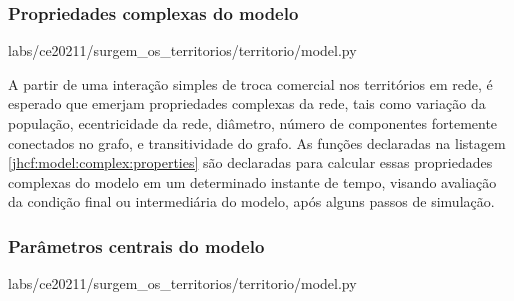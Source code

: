 \subsubsection{Propriedades complexas do modelo}


{labs/ce20211/surgem_os_territorios/territorio/model.py}

A partir de uma interação simples de troca comercial nos territórios em rede, é esperado que emerjam propriedades complexas da rede, tais como variação da população, ecentricidade da rede, diâmetro, número de componentes fortemente conectados no grafo, e transitividade do grafo.
As funções declaradas na listagem \ref{jhcf:model:complex:properties} são declaradas para calcular essas propriedades complexas do modelo em um determinado instante de tempo, visando avaliação da condição final ou intermediária do modelo, após alguns passos de simulação.

\subsubsection{Parâmetros centrais do modelo\label{jhcf:model:parameters}}


{labs/ce20211/surgem_os_territorios/territorio/model.py}


